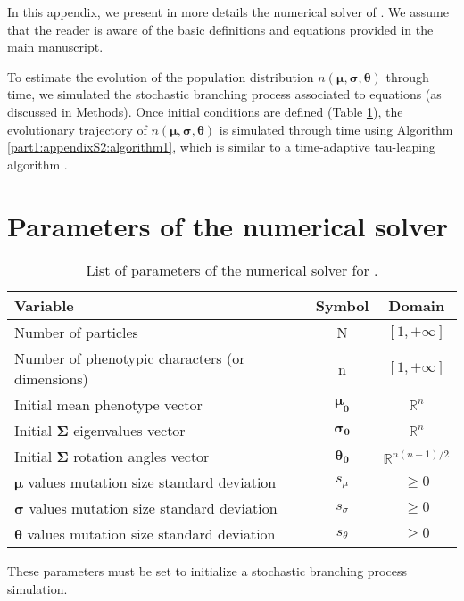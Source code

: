 
In this appendix, we present in more details the numerical solver of {\sigmaFGM}. We assume that the reader is aware of the basic definitions and equations provided in the main manuscript.

To estimate the evolution of the population distribution $n(\boldsymbol{\mu}, \boldsymbol{\sigma}, \boldsymbol{\theta})$ through time, we simulated the stochastic branching process associated to {\sigmaFGM} equations (as discussed in Methods). Once initial conditions are defined (Table \ref{part1:appendixS2:table1}), the evolutionary trajectory of $n(\boldsymbol{\mu}, \boldsymbol{\sigma}, \boldsymbol{\theta})$ is simulated through time using Algorithm \ref{part1:appendixS2:algorithm1}, which is similar to a time-adaptive tau-leaping algorithm \citep{gillespie-2007}.


\section*{Parameters of the numerical solver}

\begin{table}[!ht]
\begin{adjustwidth}{-0in}{0in}
\centering
\caption{List of parameters of the numerical solver for {\sigmaFGM}.}
\begin{tabular}{|l|c|c|}
\hline
Variable & Symbol & Domain\\
\hline
Number of particles & N & $[1, +\infty]$\\
Number of phenotypic characters (or dimensions) & n & $[1, +\infty]$\\
Initial mean phenotype vector & $\boldsymbol{\mu_0}$ & $\mathbb{R}^n$\\
Initial $\boldsymbol{\Sigma}$ eigenvalues vector & $\boldsymbol{\sigma_0}$ & $\mathbb{R}^{n}$\\
Initial $\boldsymbol{\Sigma}$ rotation angles vector & $\boldsymbol{\theta_0}$ & $\mathbb{R}^{n(n-1)/2}$\\
$\boldsymbol{\mu}$ values mutation size standard deviation & $s_\mu$ & $\geq 0$\\
$\boldsymbol{\sigma}$ values mutation size standard deviation & $s_\sigma$ & $\geq 0$\\
$\boldsymbol{\theta}$ values mutation size standard deviation & $s_\theta$ & $\geq 0$\\
\hline
\end{tabular}
\begin{flushleft}
These parameters must be set to initialize a stochastic branching process simulation.
\end{flushleft}
\label{part1:appendixS2:table1}
\end{adjustwidth}
\end{table}

